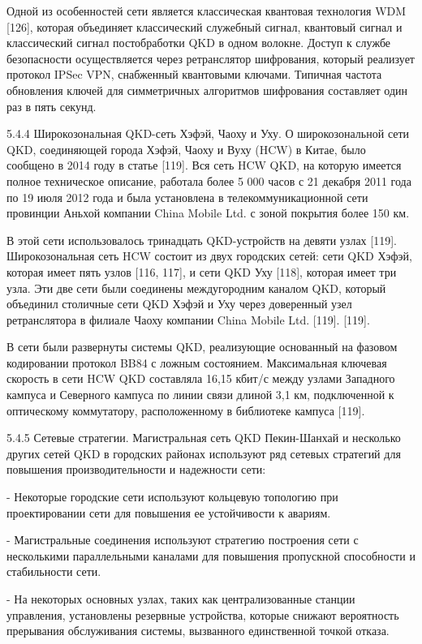 Одной из особенностей сети является классическая квантовая технология WDM [126], которая объединяет классический служебный сигнал, квантовый сигнал и классический сигнал постобработки QKD в одном волокне. Доступ к службе безопасности осуществляется через ретранслятор шифрования, который реализует протокол IPSec VPN, снабженный квантовыми ключами. Типичная частота обновления ключей для симметричных алгоритмов шифрования составляет один раз в пять секунд.

5.4.4 Широкозональная QKD-сеть Хэфэй, Чаоху и Уху. О широкозональной сети QKD, соединяющей города Хэфэй, Чаоху и Вуху (HCW) в Китае, было сообщено в 2014 году в статье [119].
Вся сеть HCW QKD, на которую имеется полное техническое описание, работала более 5 000 часов с 21 декабря 2011 года по 19 июля 2012 года и была установлена в телекоммуникационной сети провинции Аньхой компании China Mobile Ltd. с зоной покрытия более 150 км.

В этой сети использовалось тринадцать QKD-устройств на девяти узлах [119]. Широкозональная сеть HCW состоит из двух городских сетей: сети QKD Хэфэй, которая имеет пять узлов [116, 117], и сети QKD Уху [118], которая имеет три узла. Эти две сети были соединены междугородним каналом QKD, который объединил столичные сети QKD Хэфэй и Уху через доверенный узел ретранслятора в филиале Чаоху компании China Mobile Ltd. [119]. [119].

В сети были развернуты системы QKD, реализующие основанный на фазовом кодировании протокол BB84 с ложным состоянием. Максимальная ключевая скорость в сети HCW QKD составляла 16,15 кбит/с между узлами Западного кампуса и Северного кампуса по линии связи длиной 3,1 км, подключенной к оптическому коммутатору, расположенному в библиотеке кампуса [119].

5.4.5 Сетевые стратегии. Магистральная сеть QKD Пекин-Шанхай и несколько других сетей QKD в городских районах используют ряд сетевых стратегий для повышения производительности и надежности сети:

- Некоторые городские сети используют кольцевую топологию при проектировании сети для повышения ее устойчивости к авариям.

- Магистральные соединения используют стратегию построения сети с несколькими параллельными каналами для повышения пропускной способности и стабильности сети.

- На некоторых основных узлах, таких как централизованные станции управления, установлены резервные устройства, которые снижают вероятность прерывания обслуживания системы, вызванного единственной точкой отказа.

